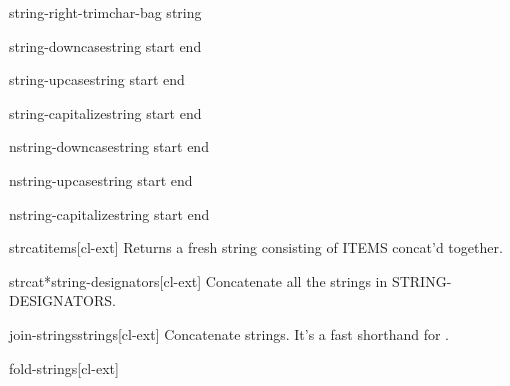 \documentclass[10pt,english]{book}
\begin{document}
\begin{function}{string-right-trim}{char-bag string}
  
\end{function}

\begin{function}{string-downcase}{string \key start end}
  
\end{function}

\begin{function}{string-upcase}{string \key start end}
  
\end{function}

\begin{function}{string-capitalize}{string \key start end}
  
\end{function}

\begin{function}{nstring-downcase}{string \key start end}
  
\end{function}

\begin{function}{nstring-upcase}{string \key start end}
  
\end{function}

\begin{function}{nstring-capitalize}{string \key start end}
  
\end{function}

\begin{function}{strcat}{\rest items}[cl-ext]
  Returns a fresh string consisting of ITEMS concat'd together.
\end{function}

\begin{function}{strcat*}{string-designators}[cl-ext]
  Concatenate all the strings in STRING-DESIGNATORS.
\end{function}

\begin{function}{join-strings}{strings}[cl-ext]
  Concatenate strings. It's a fast shorthand for .
\end{function}

\begin{function}{fold-strings}{}[cl-ext]
  
\end{function}
\end{document}
